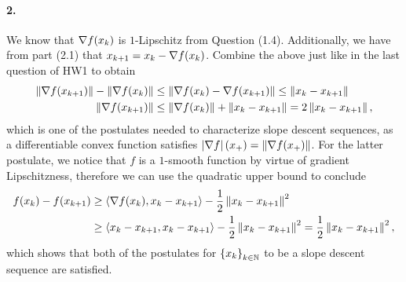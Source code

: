 \documentclass[10pt]{article}
\begin{document}
\paragraph{2.}
We know that $\nabla f(x_k)$ is $1$-Lipschitz from Question (1.4).
Additionally, we have from part (2.1) that $x_{k+1} = x_k - \nabla f(x_k)$.
Combine the above just like in the last question of HW1 to obtain
\begin{align*}
    \left \| \nabla f(x_{k+1}) \right \| - \left \| \nabla f(x_k) \right \| &\leq
    \left \| \nabla f(x_k) - \nabla f(x_{k+1}) \right \| \leq \left \| x_k - x_{k+1} \right \| \\
    \left \| \nabla f(x_{k+1}) \right \| &\leq \left \| \nabla f(x_k) \right \| + \left \| x_k - x_{k+1} \right \|
        = 2 \left \| x_k - x_{k+1} \right \|,
\end{align*}
which is one of the postulates needed to characterize slope descent sequences,
as a differentiable convex function satisfies $\left| \nabla f \right|(x_+) =
\left \| \nabla f(x_+) \right \|$. For the latter postulate, we notice that $f$ is a
$1$-smooth function by virtue of gradient Lipschitzness, therefore we can
use the quadratic upper bound to conclude
\begin{align*}
    f(x_k) - f(x_{k+1}) &\geq \left\langle \nabla f(x_{k}), x_k - x_{k+1} \right\rangle - \frac{1}{2}
    \left \| x_k - x_{k+1} \right \|^2 \\
    &\geq \left\langle x_k - x_{k+1}, x_k - x_{k+1} \right\rangle - \frac{1}{2} \left \| x_k - x_{k+1} \right \|^2
    = \frac{1}{2} \left \| x_k - x_{k+1} \right \|^2,
\end{align*}
which shows that both of the postulates for $\left\{ x_k \right\}_{k \in \mathbb{N}}$ to be a
slope descent sequence are satisfied.
\end{document}
